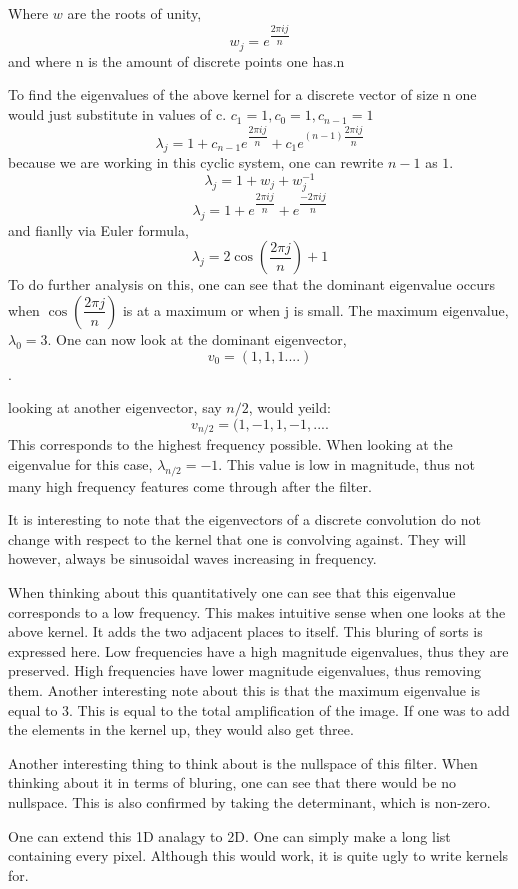 \documentclass[11pt]{article}
\begin{document}
Where $w$ are the roots of unity,
$$w_j = e^{\dfrac{2\pi i j}{n}}$$
and where n is the amount of discrete points one has.‪n 
 
 To find the eigenvalues of the above kernel for a discrete vector of size n one would just substitute in values of c. $c_1 = 1, c_0 = 1, c_{n-1}=1$
 $$\lambda_j =1+c_{n-1}e^{\dfrac{2\pi i j}{n}}+c_{1}e^{(n-1) \dfrac{2\pi i j}{n}}$$
 because we are working in this cyclic system, one can rewrite $n-1$ as $1$. 
 $$\lambda_j = 1+w_j+w_j^{-1}$$
 $$\lambda_j =1+e^{\dfrac{2\pi i j}{n}}+e^{\dfrac{-2\pi i j}{n}}$$
and fianlly via Euler formula, 
$$\lambda_j = 2 \cos(\dfrac{2\pi j}{n})+1$$
To do further analysis on this, one can see that the dominant eigenvalue occurs when $\cos(\dfrac{2 \pi j}{n})$ is at a maximum or when j is small. The maximum eigenvalue, $\lambda_0 = 3$. 
One can now look at the dominant eigenvector,
$$v_0 = (1,1,1....)$$. 

looking at another eigenvector, say $n/2$, would yeild: 
$$v_{n/2} = (1, -1, 1, -1, ....$$ This corresponds to the highest frequency possible. When looking at the eigenvalue for this case, $\lambda_{n/2}=-1$. This value is low in magnitude, thus not many high frequency features come through after the filter.

It is interesting to note that the eigenvectors of a discrete convolution do not change with respect to the kernel that one is convolving against. They will however, always be sinusoidal waves increasing in frequency. 

When thinking about this quantitatively one can see that this eigenvalue corresponds to a low frequency. This makes intuitive sense when one looks at the above kernel. It adds the two adjacent places to itself. This bluring of sorts is expressed here. Low frequencies have a high magnitude eigenvalues, thus they are preserved. High frequencies have lower magnitude eigenvalues, thus removing them.
Another interesting note about this is that the maximum eigenvalue is equal to 3. This is equal to the total amplification of the image. If one was to add the elements in the kernel up, they would also get three. 

Another interesting thing to think about is the nullspace of this filter. When thinking about it in terms of bluring, one can see that there would be no nullspace. This is also confirmed by taking the determinant, which is non-zero. 

One can extend this 1D analagy to 2D. One can simply make a long list containing every pixel. Although this would work, it is quite ugly to write kernels for. 
\end{document}
